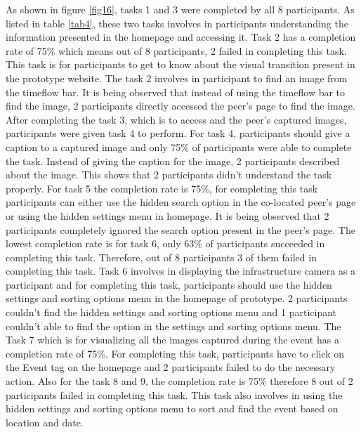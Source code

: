 \documentclass[mscthesis]{usiinfthesis}
\begin{document}
As shown in figure \ref{fig16}, tasks 1 and 3 were completed by all 8 participants. As listed in table \ref{tab4}, these two tasks involves in participants understanding the information presented in the homepage and accessing it. Task 2 has a completion rate of 75\% which means out of 8 participants, 2 failed in completing this task. This task is for participants to get to know about the visual transition present in the prototype website. The task 2 involves in participant to find an image from the timeflow bar. It is being observed that instead of using the timeflow bar to find the image, 2 participants directly accessed the peer's page to find the image. After completing the task 3, which is to access and the peer's captured images, participants were given task 4 to perform. For task 4, participants should give a caption to a captured image and only 75\% of participants were able to complete the task. Instead of giving the caption for the image, 2 participants described about the image. This shows that 2 participants didn't understand the task properly. For task 5 the completion rate is 75\%, for completing this task participants can either use the hidden search option in the co-located peer's page or using the hidden settings menu in homepage. It is being observed that 2 participants completely ignored the search option present in the peer's page. The lowest completion rate is for task 6, only 63\% of participants succeeded in completing this task. Therefore, out of 8 participants 3 of them failed in completing this task. Task 6 involves in displaying the infrastructure camera as a participant and for completing this task, participants should use the hidden settings and sorting options menu in the homepage of prototype. 2 participants couldn't find the hidden settings and sorting options menu and 1 participant couldn't able to find the option in the settings and sorting options menu. The Task 7 which is for visualizing all the images captured during the event has a completion rate of 75\%. For completing this task, participants have to click on the Event tag on the homepage and 2 participants failed to do the necessary action. Also for the task 8 and 9, the completion rate is 75\% therefore 8 out of 2 participants failed in completing this task. This task also involves in using the hidden settings and sorting options menu to sort and find the event based on location and date. 
\end{document}

